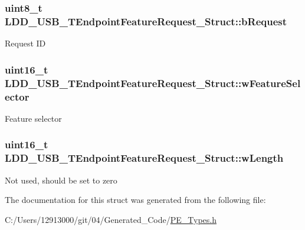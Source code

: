 \subsubsection[{b\+Request}]{\setlength{\rightskip}{0pt plus 5cm}uint8\+\_\+t L\+D\+D\+\_\+\+U\+S\+B\+\_\+\+T\+Endpoint\+Feature\+Request\+\_\+\+Struct\+::b\+Request}\label{struct_l_d_d___u_s_b___t_endpoint_feature_request___struct_acd2dcd4a8762d22f84cfe3b9d9607a25}
Request I\+D \hypertarget{struct_l_d_d___u_s_b___t_endpoint_feature_request___struct_aa026e7ce420430dc65a72dcc10337553}{}
\subsubsection[{w\+Feature\+Selector}]{\setlength{\rightskip}{0pt plus 5cm}uint16\+\_\+t L\+D\+D\+\_\+\+U\+S\+B\+\_\+\+T\+Endpoint\+Feature\+Request\+\_\+\+Struct\+::w\+Feature\+Selector}\label{struct_l_d_d___u_s_b___t_endpoint_feature_request___struct_aa026e7ce420430dc65a72dcc10337553}
Feature selector \hypertarget{struct_l_d_d___u_s_b___t_endpoint_feature_request___struct_aec7dc034039bc4deb5c811afac0686a5}{}
\subsubsection[{w\+Length}]{\setlength{\rightskip}{0pt plus 5cm}uint16\+\_\+t L\+D\+D\+\_\+\+U\+S\+B\+\_\+\+T\+Endpoint\+Feature\+Request\+\_\+\+Struct\+::w\+Length}\label{struct_l_d_d___u_s_b___t_endpoint_feature_request___struct_aec7dc034039bc4deb5c811afac0686a5}
Not used, should be set to zero 

The documentation for this struct was generated from the following file\+:\begin{DoxyCompactItemize}
\item 
C\+:/\+Users/12913000/git/04/\+Generated\+\_\+\+Code/\hyperlink{_p_e___types_8h}{P\+E\+\_\+\+Types.\+h}\end{DoxyCompactItemize}
